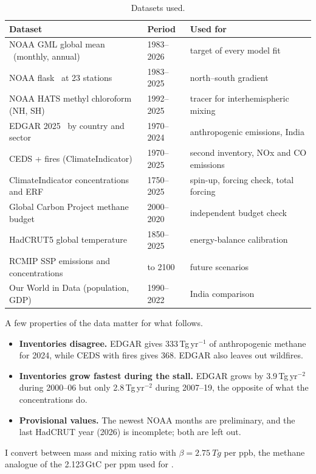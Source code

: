 \documentclass[11pt,a4paper]{article}
\newcommand{\CH}{\ce{CH4}}
\begin{document}
\begin{table}[h]
\centering\small
\caption{Datasets used.}
\label{tab:data}
\begin{tabular}{p{5.3cm}p{3.2cm}p{6.1cm}}
\toprule
Dataset & Period & Used for\\
\midrule
NOAA GML global mean \CH\ (monthly, annual) & 1983--2026 & target of every model fit\\
NOAA flask \CH\ at 23 stations & 1983--2025 & north--south gradient\\
NOAA HATS methyl chloroform (NH, SH) & 1992--2025 & tracer for interhemispheric mixing\\
EDGAR 2025 \CH\ by country and sector & 1970--2024 & anthropogenic emissions, India\\
CEDS + fires (ClimateIndicator) & 1970--2025 & second inventory, NOx and CO emissions\\
ClimateIndicator concentrations and ERF & 1750--2025 & spin-up, forcing check, total forcing\\
Global Carbon Project methane budget & 2000--2020 & independent budget check\\
HadCRUT5 global temperature & 1850--2025 & energy-balance calibration\\
RCMIP SSP emissions and concentrations & to 2100 & future scenarios\\
Our World in Data (population, GDP) & 1990--2022 & India comparison\\
\bottomrule
\end{tabular}
\end{table}

A few properties of the data matter for what follows.
\begin{itemize}\itemsep0pt
\item \textbf{Inventories disagree.} EDGAR gives 333\,Tg\,yr$^{-1}$ of anthropogenic methane for 2024, while CEDS with fires gives 368. EDGAR also leaves out wildfires.
\item \textbf{Inventories grow fastest during the stall.} EDGAR grows by 3.9\,Tg\,yr$^{-2}$ during 2000--06 but only 2.8\,Tg\,yr$^{-2}$ during 2007--19, the opposite of what the concentrations do.
\item \textbf{Provisional values.} The newest NOAA months are preliminary, and the last HadCRUT year (2026) is incomplete; both are left out.
\end{itemize}
I convert between mass and mixing ratio with $\beta=\SI{2.75}{Tg}$ per ppb, the methane analogue of the 2.123\,GtC per ppm used for .
\end{document}
